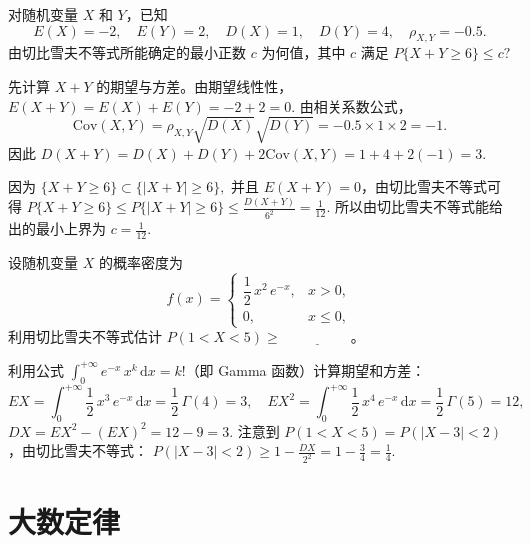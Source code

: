 \documentclass[lang=cn,11pt]{elegantbook}
\begin{document}
\begin{exercise}\label{exer:src-2013-a-01-04}\label{exer:src-2004-2a-16}
对随机变量 \(X\) 和 \(Y\)，已知
\[
E(X)=-2,\quad E(Y)=2,\quad D(X)=1,\quad D(Y)=4,\quad \rho_{X,Y}=-0.5.
\]
由切比雪夫不等式所能确定的最小正数 \(c\) 为何值，其中 \(c\) 满足
\(
P\{X+Y\ge 6\}\le c?
\)
\end{exercise}
\begin{solution}
先计算 \(X+Y\) 的期望与方差。由期望线性性，
\(
E(X+Y)=E(X)+E(Y)=-2+2=0.
\)
由相关系数公式，
\[
\mathrm{Cov}(X,Y)=\rho_{X,Y}\sqrt{D(X)}\sqrt{D(Y)}
=-0.5\times 1\times 2=-1.
\]
因此
\(
D(X+Y)=D(X)+D(Y)+2\mathrm{Cov}(X,Y)
=1+4+2(-1)=3.
\)

因为
\(
\{X+Y\ge6\}\subset \{|X+Y|\ge6\},
\)
并且 \(E(X+Y)=0\)，由切比雪夫不等式可得
\(
P\{X+Y\ge6\}
\le P\{|X+Y|\ge6\}
\le \frac{D(X+Y)}{6^2}
=\frac{1}{12}.
\)
所以由切比雪夫不等式能给出的最小上界为
\(
c=\frac1{12}.
\)
\end{solution}

\begin{exercise}\label{exer:5-chebyshev-pdf}
设随机变量 \(X\) 的概率密度为
\[
f(x) = \begin{cases} \dfrac{1}{2}\,x^2\,e^{-x}, & x > 0, \\ 0, & x \leq 0, \end{cases}
\]
利用切比雪夫不等式估计 \(P(1 < X < 5) \geq\,\underline{\hspace{2cm}}\)。
\end{exercise}
\begin{solution}
利用公式 \(\displaystyle\int_0^{+\infty} e^{-x}\,x^k\,\mathrm{d}x = k!\)（即 Gamma 函数）计算期望和方差：
\[
EX = \int_0^{+\infty} \frac{1}{2}\,x^3\,e^{-x}\,\mathrm{d}x = \frac{1}{2}\,\Gamma(4) = 3,\quad
EX^2 = \int_0^{+\infty} \frac{1}{2}\,x^4\,e^{-x}\,\mathrm{d}x = \frac{1}{2}\,\Gamma(5) = 12,
\]
\(
DX = EX^2 - (EX)^2 = 12 - 9 = 3.
\)
注意到 \(P(1 < X < 5) = P(|X - 3| < 2)\)，由切比雪夫不等式：
\(
P(|X - 3| < 2) \geq 1 - \frac{DX}{2^2} = 1 - \frac{3}{4} = \frac{1}{4}.
\)
\end{solution}



\section{大数定律}
\end{document}
